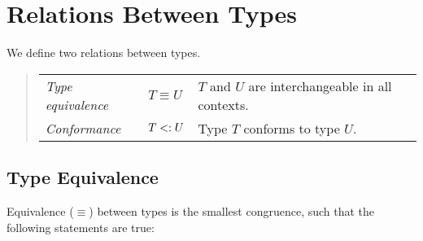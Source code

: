 \section{Relations Between Types}

We define two relations between types. 
\begin{quote}\begin{tabular}{l@{\gap}l@{\gap}l}
\em Type equivalence & $T \equiv U$ & $T$ and $U$ are interchangeable
in all contexts.
\\
\em Conformance & $T <: U$ & Type $T$ conforms to type $U$.
\end{tabular}\end{quote}






\subsection{Type Equivalence}

Equivalence ($\equiv$) between types is the smallest congruence, such that the following statements are true:

